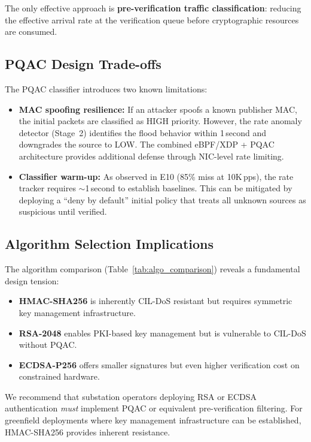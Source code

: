 \documentclass{ieeeaccess}
\begin{document}
The only effective approach is \textbf{pre-verification traffic classification}: reducing the effective arrival rate at the verification queue before cryptographic resources are consumed.

\subsection{PQAC Design Trade-offs}
The PQAC classifier introduces two known limitations:
\begin{itemize}[leftmargin=*]
    \item \textbf{MAC spoofing resilience:} If an attacker spoofs a known publisher MAC, the initial packets are classified as HIGH priority. However, the rate anomaly detector (Stage~2) identifies the flood behavior within 1\,second and downgrades the source to LOW. The combined eBPF/XDP + PQAC architecture provides additional defense through NIC-level rate limiting.
    \item \textbf{Classifier warm-up:} As observed in E10 (85\% miss at 10K\,pps), the rate tracker requires $\sim$1\,second to establish baselines. This can be mitigated by deploying a ``deny by default'' initial policy that treats all unknown sources as suspicious until verified.
\end{itemize}

\subsection{Algorithm Selection Implications}
The algorithm comparison (Table~\ref{tab:algo_comparison}) reveals a fundamental design tension:
\begin{itemize}[leftmargin=*]
    \item \textbf{HMAC-SHA256} is inherently CIL-DoS resistant but requires symmetric key management infrastructure.
    \item \textbf{RSA-2048} enables PKI-based key management but is vulnerable to CIL-DoS without PQAC.
    \item \textbf{ECDSA-P256} offers smaller signatures but even higher verification cost on constrained hardware.
\end{itemize}

We recommend that substation operators deploying RSA or ECDSA authentication \emph{must} implement PQAC or equivalent pre-verification filtering. For greenfield deployments where key management infrastructure can be established, HMAC-SHA256 provides inherent resistance.
\end{document}
